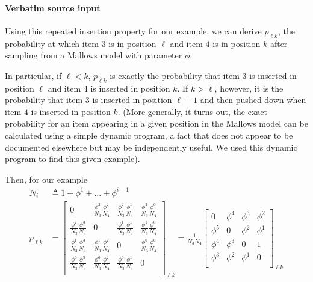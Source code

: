 \documentclass[10pt]{article}
\begin{document}
\paragraph{Verbatim source input}
\begin{ReviewVerbatim}
Using this repeated insertion property for our example, we can derive $p_{\ell k}$, the probability at which item $3$ is in position $\ell$ and item $4$ is in position $k$ after sampling from a Mallows model with parameter $\phi$.

In particular, if $\ell < k$, $p_{\ell k}$ is exactly the probability that item $3$ is inserted in position $\ell$ and item $4$ is inserted in position $k$. If $k>\ell$, however, it is the probability that item $3$ is inserted in position $\ell - 1$ and then pushed down when item $4$ is inserted in position $k$. (More generally, it turns out, the exact probability for an item appearing in a given position in the Mallows model can be calculated using a simple dynamic program, a fact that does not appear to be documented  elsewhere but may be independently useful. We used this dynamic program to find this given example).

Then, for our example
\begin{align*}
N_i &\triangleq 1 + \phi^1 + \dots + \phi^{i-1} \\
p_{\ell k} &= \begin{bmatrix}
0 & \frac{\phi^2}{N_3}\frac{\phi^2}{N_4} & \frac{\phi^2}{N_3}\frac{\phi^1}{N_4} & \frac{\phi^2}{N_3}\frac{\phi^0}{N_4}\\
\frac{\phi^2}{N_3}\frac{\phi^3}{N_4} & 0 & \frac{\phi^1}{N_3}\frac{\phi^1}{N_4} & \frac{\phi^1}{N_3}\frac{\phi^0}{N_4}\\
\frac{\phi^1}{N_3}\frac{\phi^3}{N_4} & \frac{\phi^1}{N_3}\frac{\phi^2}{N_4} & 0 & \frac{\phi^0}{N_3}\frac{\phi^0}{N_4}\\
\frac{\phi^0}{N_3}\frac{\phi^3}{N_4} & \frac{\phi^0}{N_3}\frac{\phi^2}{N_4} & \frac{\phi^0}{N_3}\frac{\phi^1}{N_4} & 0\\
\end{bmatrix}_{\ell k}
=
\frac{1}{N_3N_4}\begin{bmatrix}
0 & \phi^4 & \phi^3 & {\phi^2}\\
\phi^5 & 0 & \phi^2 & {\phi^1}\\
\phi^4 & \phi^3 & 0 & 1\\
{\phi^3} & {\phi^2} & {\phi^1} & 0\\
\end{bmatrix}_{\ell k}
\end{align*}
\end{ReviewVerbatim}
\end{document}
